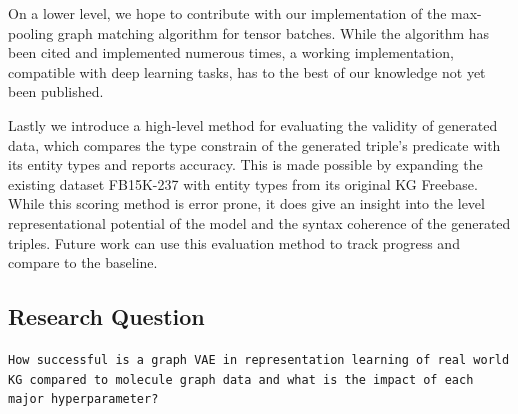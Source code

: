 On a lower level, we hope to contribute with our implementation of the max-pooling graph matching algorithm for tensor batches. While the algorithm has been cited and implemented numerous times, a working implementation, compatible with deep learning tasks, has to the best of our knowledge not yet been published.  

Lastly we introduce a high-level method for evaluating the validity of generated data, which compares the type constrain of the generated triple's predicate with its entity types and reports accuracy. This is made possible by expanding the existing dataset FB15K-237 with entity types from its original KG Freebase. While this scoring method is error prone, it does give an insight into the level representational potential of the model and the syntax coherence of the generated triples. Future work can use this evaluation method to track progress and compare to the baseline. 



\subsection{Research Question}

\begin{center}
    \texttt{How successful is a graph VAE in representation learning of real world KG compared to molecule graph data and what is the impact of each major hyperparameter?}
    \label{sec1:requestion}
\end{center}


